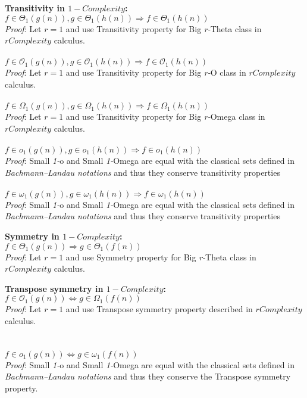  \textbf{Transitivity in $1-Complexity$:}  \\  $ f \in \Theta_{1}(g(n)),  g \in \Theta_{1}(h(n)) \Rightarrow  f \in \Theta_{1}(h(n))$   
    \\\textit{Proof}:
   Let $r = 1$ and use Transitivity property for Big \textit{r-}Theta class in $rComplexity$ calculus.
 \qedsymbol
 \\ \\
 $ f \in \mathcal{O}_{1}(g(n)),  g \in \mathcal{O}_{1}(h(n)) \Rightarrow  f \in \mathcal{O}_{1}(h(n))$ 
     \\\textit{Proof}:
   Let $r = 1$ and use Transitivity property for Big \textit{r-}O class in $rComplexity$ calculus.
 \qedsymbol
 \\ \\
 $ f \in \Omega_{1}(g(n)),  g \in \Omega_{1}(h(n)) \Rightarrow  f \in \Omega_{1}(h(n))$ 
     \\\textit{Proof}:
   Let $r = 1$ and use Transitivity property for Big \textit{r-}Omega class in $rComplexity$ calculus.
 \qedsymbol
 \\ \\
 $ f \in o_{1}(g(n)),  g \in o_{1}(h(n)) \Rightarrow  f \in o_{1}(h(n))$ 
     \\\textit{Proof}:
   Small \textit{1-}o and Small \textit{1-}Omega are equal with the classical sets defined in \textit{Bachmann–Landau notations} and thus they conserve transitivity properties
 \qedsymbol
 \\ \\
 $ f \in \omega_{1}(g(n)),  g \in \omega_{1}(h(n)) \Rightarrow  f \in \omega_{1}(h(n))$
     \\\textit{Proof}:
   Small \textit{1-}o and Small \textit{1-}Omega are equal with the classical sets defined in \textit{Bachmann–Landau notations} and thus they conserve transitivity properties
 \qedsymbol
  \hfill\break

 \textbf{Symmetry in $1-Complexity$:}  \\  $ f \in \Theta_{1}(g(n)) \Rightarrow g \in \Theta_{1}(f(n)) $
     \\\textit{Proof}:
   Let $r = 1$ and use Symmetry property for Big \textit{r-}Theta class in $rComplexity$ calculus.
 \qedsymbol
 \hfill\break

 \textbf{Transpose symmetry in $1-Complexity$:}  \\  $ f \in \mathcal{O}_{1}(g(n)) \Leftrightarrow g \in \Omega_{1}(f(n)) $
      \\\textit{Proof}:
   Let $r = 1$ and use Transpose symmetry property described in $rComplexity$ calculus.
 \qedsymbol
 \\ \\
 \\  $ f \in o_{1}(g(n)) \Leftrightarrow g \in \omega_{1}(f(n)) $
      \\\textit{Proof}:
   Small \textit{1-}o and Small \textit{1-}Omega are equal with the classical sets defined in \textit{Bachmann–Landau notations} and thus they conserve the Transpose symmetry property.
 \qedsymbol

